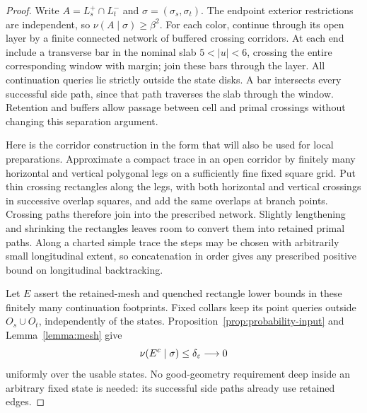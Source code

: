 \begin{proof}
Write $A=L_s^+\cap L_t^-$ and $\sigma=(\sigma_s,\sigma_t)$.  The endpoint
exterior restrictions are independent, so $\nu(A\mid\sigma)\ge\beta^2$.
For each color, continue through its open layer by a finite connected
network of buffered crossing corridors.  At each end include a transverse
bar in the nominal slab $5<|u|<6$, crossing the entire corresponding
window with margin; join these bars through the layer.  All continuation
queries lie strictly outside the state disks.  A bar intersects every
successful side path, since that path traverses the slab through the
window.  Retention and buffers allow passage between cell and primal
crossings without changing this separation argument.

Here is the corridor construction in the form that will also be used
for local preparations.  Approximate a compact trace in an open corridor
by finitely many horizontal and vertical polygonal legs on a sufficiently
fine fixed square grid.  Put thin crossing rectangles along the legs,
with both horizontal and vertical crossings in successive overlap
squares, and add the same overlaps at branch points.  Crossing paths
therefore join into the prescribed network.  Slightly lengthening and
shrinking the rectangles leaves room to convert them into retained
primal paths.  Along a charted simple trace the steps may be chosen with
arbitrarily small longitudinal extent, so concatenation in order gives
any prescribed positive bound on longitudinal backtracking.

Let $E$ assert the retained-mesh and quenched rectangle lower bounds in
these finitely many continuation footprints.  Fixed collars keep its
point queries outside $O_s\cup O_t$, independently of the states.
Proposition~\ref{prop:probability-input} and Lemma~\ref{lemma:mesh} give
\[
 \nu(E^c\mid\sigma)\le\delta_\varepsilon\longrightarrow0
\]
uniformly over the usable states.  No good-geometry requirement deep
inside an arbitrary fixed state is needed: its successful side paths
already use retained edges.


\end{proof}
